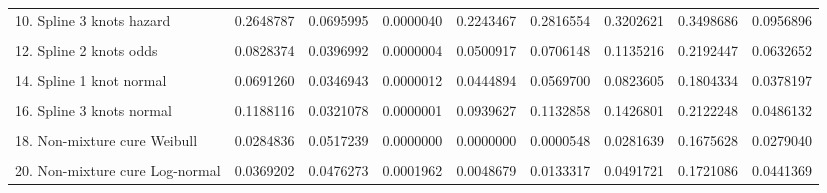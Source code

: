 \documentclass[]{article}
\begin{document}
\begin{table}
{\begin{tabular}[t]{lrrrrrrrr}
10. Spline 3 knots hazard & 0.2648787 & 0.0695995 & 0.0000040 & 0.2243467 & 0.2816554 & 0.3202621 & 0.3498686 & 0.0956896\\
\cellcolor{gray!6}{11. Spline 1 knot odds} & \cellcolor{gray!6}{0.0602433} & \cellcolor{gray!6}{0.0377595} & \cellcolor{gray!6}{0.0004610} & \cellcolor{gray!6}{0.0331955} & \cellcolor{gray!6}{0.0461415} & \cellcolor{gray!6}{0.0743721} & \cellcolor{gray!6}{0.1809477} & \cellcolor{gray!6}{0.0410625}\\
12. Spline 2 knots odds & 0.0828374 & 0.0396992 & 0.0000004 & 0.0500917 & 0.0706148 & 0.1135216 & 0.2192447 & 0.0632652\\
\cellcolor{gray!6}{13. Spline 3 knots odds} & \cellcolor{gray!6}{0.0937702} & \cellcolor{gray!6}{0.0420449} & \cellcolor{gray!6}{0.0000052} & \cellcolor{gray!6}{0.0581364} & \cellcolor{gray!6}{0.0821832} & \cellcolor{gray!6}{0.1255993} & \cellcolor{gray!6}{0.2117141} & \cellcolor{gray!6}{0.0672824}\\
14. Spline 1 knot normal & 0.0691260 & 0.0346943 & 0.0000012 & 0.0444894 & 0.0569700 & 0.0823605 & 0.1804334 & 0.0378197\\
\cellcolor{gray!6}{15. Spline 2 knots normal} & \cellcolor{gray!6}{0.0933942} & \cellcolor{gray!6}{0.0319718} & \cellcolor{gray!6}{0.0000000} & \cellcolor{gray!6}{0.0682231} & \cellcolor{gray!6}{0.0852159} & \cellcolor{gray!6}{0.1164045} & \cellcolor{gray!6}{0.2005479} & \cellcolor{gray!6}{0.0480608}\\
16. Spline 3 knots normal & 0.1188116 & 0.0321078 & 0.0000001 & 0.0939627 & 0.1132858 & 0.1426801 & 0.2122248 & 0.0486132\\
\cellcolor{gray!6}{17. Mixture cure Weibull} & \cellcolor{gray!6}{0.0274205} & \cellcolor{gray!6}{0.0519801} & \cellcolor{gray!6}{0.0000000} & \cellcolor{gray!6}{0.0000000} & \cellcolor{gray!6}{0.0000059} & \cellcolor{gray!6}{0.0191609} & \cellcolor{gray!6}{0.1672892} & \cellcolor{gray!6}{0.0189217}\\
18. Non-mixture cure Weibull & 0.0284836 & 0.0517239 & 0.0000000 & 0.0000000 & 0.0000548 & 0.0281639 & 0.1675628 & 0.0279040\\
\cellcolor{gray!6}{19. Mixture cure Log-normal} & \cellcolor{gray!6}{0.0386248} & \cellcolor{gray!6}{0.0496451} & \cellcolor{gray!6}{0.0001478} & \cellcolor{gray!6}{0.0035974} & \cellcolor{gray!6}{0.0128314} & \cellcolor{gray!6}{0.0569406} & \cellcolor{gray!6}{0.1684663} & \cellcolor{gray!6}{0.0533108}\\
20. Non-mixture cure Log-normal & 0.0369202 & 0.0476273 & 0.0001962 & 0.0048679 & 0.0133317 & 0.0491721 & 0.1721086 & 0.0441369\\

\end{tabular}}
\end{table}
\end{document}
